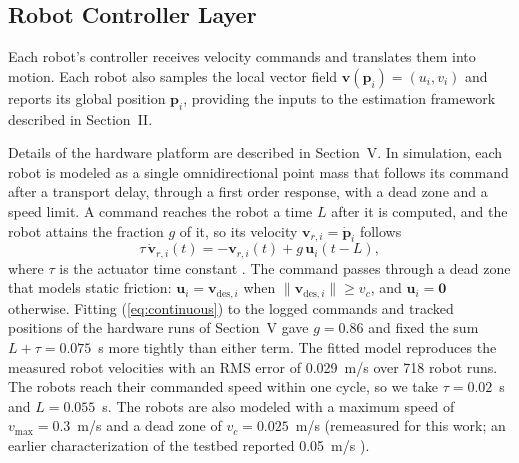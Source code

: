 \documentclass[lettersize,journal]{IEEEtran}
\newcommand{\rev}[1]{#1}
\begin{document}
\subsection{Robot Controller Layer}
\noindent 

Each robot's controller receives velocity commands and translates them into motion. Each robot also samples the local vector field $\mathbf{v}(\mathbf{p}_i) = (u_i, v_i)$ and reports its global position $\mathbf{p}_i$, providing the inputs to the estimation framework described in Section~II.

Details of the hardware platform are described in Section~V. In simulation, each robot is modeled as a single omnidirectional point mass that follows its command after a transport delay, through a first order response, with a dead zone and a speed limit. A command reaches the robot a time $L$ after it is computed, and the robot attains the fraction $g$ of it, so its velocity $\mathbf{v}_{r,i} = \dot{\mathbf{p}}_i$ follows
\begin{equation}
    \tau\,\dot{\mathbf{v}}_{r,i}(t) = -\mathbf{v}_{r,i}(t) + g\,\mathbf{u}_i(t - L),
    \label{eq:continuous}
\end{equation}
where $\tau$ is the actuator time constant \cite{4,7}. The command passes through a dead zone that models static friction: $\mathbf{u}_i = \mathbf{v}_{\text{des},i}$ when $\|\mathbf{v}_{\text{des},i}\| \ge v_c$, and $\mathbf{u}_i = \mathbf{0}$ otherwise. Fitting (\ref{eq:continuous}) to the logged commands and tracked positions of the hardware runs of Section~V gave $g = \rev{0.86}$ and fixed the sum $L + \tau = \rev{0.075}$~s more tightly than either term. The fitted model reproduces the measured robot velocities with an RMS error of \rev{0.029}~m/s over \rev{718} robot runs. The robots reach their commanded speed within one cycle, so we take $\tau = \rev{0.02}$~s and $L = \rev{0.055}$~s. The robots are also modeled with a maximum speed of $v_{\max} = \rev{0.3}$~m/s and a dead zone of $v_c = 0.025$~m/s (remeasured for this work; an earlier characterization of the testbed reported 0.05~m/s \cite{22}).
\end{document}
